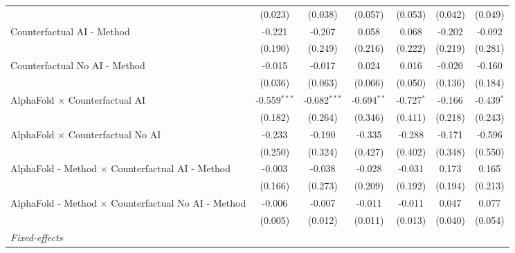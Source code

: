\begin{tabular}{lcccccc}
                                                              & (0.023)        & (0.038)        & (0.057)       & (0.053)       & (0.042)       & (0.049)\\   
   Counterfactual AI - Method                                 & -0.221         & -0.207         & 0.058         & 0.068         & -0.202        & -0.092\\   
                                                              & (0.190)        & (0.249)        & (0.216)       & (0.222)       & (0.219)       & (0.281)\\   
   Counterfactual No AI - Method                              & -0.015         & -0.017         & 0.024         & 0.016         & -0.020        & -0.160\\   
                                                              & (0.036)        & (0.063)        & (0.066)       & (0.050)       & (0.136)       & (0.184)\\   
   AlphaFold $\times$ Counterfactual AI                       & -0.559$^{***}$ & -0.682$^{***}$ & -0.694$^{**}$ & -0.727$^{*}$  & -0.166        & -0.439$^{*}$\\   
                                                              & (0.182)        & (0.264)        & (0.346)       & (0.411)       & (0.218)       & (0.243)\\   
   AlphaFold $\times$ Counterfactual No AI                    & -0.233         & -0.190         & -0.335        & -0.288        & -0.171        & -0.596\\   
                                                              & (0.250)        & (0.324)        & (0.427)       & (0.402)       & (0.348)       & (0.550)\\   
   AlphaFold - Method $\times$ Counterfactual AI - Method     & -0.003         & -0.038         & -0.028        & -0.031        & 0.173         & 0.165\\   
                                                              & (0.166)        & (0.273)        & (0.209)       & (0.192)       & (0.194)       & (0.213)\\   
   AlphaFold - Method $\times$ Counterfactual No AI - Method  & -0.006         & -0.007         & -0.011        & -0.011        & 0.047         & 0.077\\   
                                                              & (0.005)        & (0.012)        & (0.011)       & (0.013)       & (0.040)       & (0.054)\\   
   \midrule
   \emph{Fixed-effects}\\

\end{tabular}
